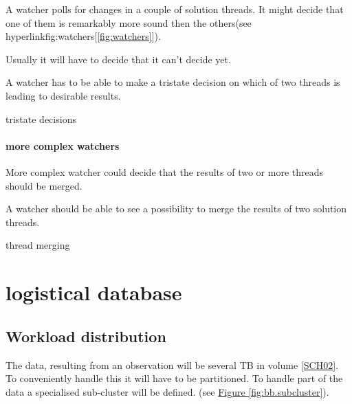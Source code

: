 \documentclass[]{lofar}
\begin{document}
          A watcher polls for changes in a couple of solution
          threads. It might decide that one of them is remarkably more
          sound then the others(see
          hyperlink{fig:watchers}{[\ref{fig:watchers}]}).

          Usually it will have to decide that it can't decide yet.

          \begin{requirement}
            A watcher has to be able to make a tristate decision on
            which of two threads is leading to desirable results.
            \caption{tristate decisions\label{req:no-decision}}
          \end{requirement}

        \paragraph{more complex watchers}
        \label{par:complex-watchers}\hypertarget{par:complex-watchers}{}

          More complex watcher could decide that the results of two or
          more threads should be merged.

          \begin{requirement}
            A watcher should be able to see a possibility to merge the
            results of two solution threads.
            \caption{thread merging\label{req:merge}}
          \end{requirement}

  \section{logistical database}
  \label{sec:logistical-datamodel}
  \hypertarget{sec:logistical-datamodel}{}

    \subsection{Workload distribution}
    \label{subsec:workload-distribution-2}\hypertarget{subsec:workload-distribution-2}{}

      The data, resulting from an observation will be several TB in
      volume
      \hyperlink{bib:LOFAR-ASTRON-MEM-035}{[SCH02]}. To
      conveniently handle this it will have to be partitioned. To
      handle part of the data a specialised sub-cluster will be
      defined. (see \hyperlink{fig:bb.subcluster}{Figure \ref{fig:bb.subcluster}}).
\end{document}
